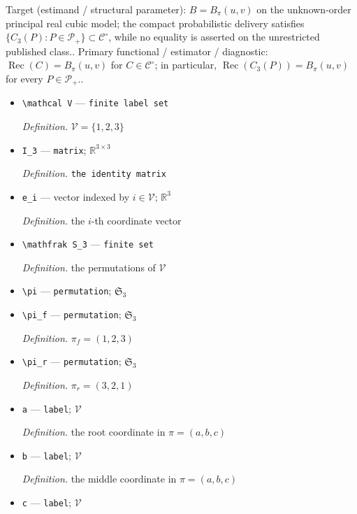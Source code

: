 \documentclass{article}
\begin{document}
Target (estimand / structural parameter): \(B=B_\pi(u,v)\) on the unknown-order principal real cubic model; the compact probabilistic delivery satisfies \(\{C_3(P):P\in\mathcal P_+\}\subset\mathcal C^\circ\), while no equality is asserted on the unrestricted published class..
Primary functional / estimator / diagnostic: \(\operatorname{Rec}(C)=B_\pi(u,v)\) for \(C\in\mathcal C^\circ\); in particular, \(\operatorname{Rec}(C_3(P))=B_\pi(u,v)\) for every \(P\in\mathcal P_+\)..
\begin{itemize}
  \item \texttt{\textbackslash{}\allowbreak{}mathcal V} --- \texttt{finite label set}
  \par\smallskip\noindent\emph{Definition.} \(\mathcal V=\{1,2,3\}\)
  \item \texttt{I\_\allowbreak{}3} --- \texttt{matrix}; \(\mathbb R^{3\times 3}\)
  \par\smallskip\noindent\emph{Definition.} \texttt{the identity matrix}
  \item \texttt{e\_\allowbreak{}i} --- vector indexed by \(i\in\mathcal V\); \(\mathbb R^3\)
  \par\smallskip\noindent\emph{Definition.} the \(i\)-th coordinate vector
  \item \texttt{\textbackslash{}\allowbreak{}mathfrak S\_\allowbreak{}3} --- \texttt{finite set}
  \par\smallskip\noindent\emph{Definition.} the permutations of \(\mathcal V\)
  \item \texttt{\textbackslash{}\allowbreak{}pi} --- \texttt{permutation}; \(\mathfrak S_3\)
  \item \texttt{\textbackslash{}\allowbreak{}pi\_\allowbreak{}f} --- \texttt{permutation}; \(\mathfrak S_3\)
  \par\smallskip\noindent\emph{Definition.} \(\pi_f=(1,2,3)\)
  \item \texttt{\textbackslash{}\allowbreak{}pi\_\allowbreak{}r} --- \texttt{permutation}; \(\mathfrak S_3\)
  \par\smallskip\noindent\emph{Definition.} \(\pi_r=(3,2,1)\)
  \item \texttt{a} --- \texttt{label}; \(\mathcal V\)
  \par\smallskip\noindent\emph{Definition.} the root coordinate in \(\pi=(a,b,c)\)
  \item \texttt{b} --- \texttt{label}; \(\mathcal V\)
  \par\smallskip\noindent\emph{Definition.} the middle coordinate in \(\pi=(a,b,c)\)
  \item \texttt{c} --- \texttt{label}; \(\mathcal V\)

\end{itemize}
\end{document}
